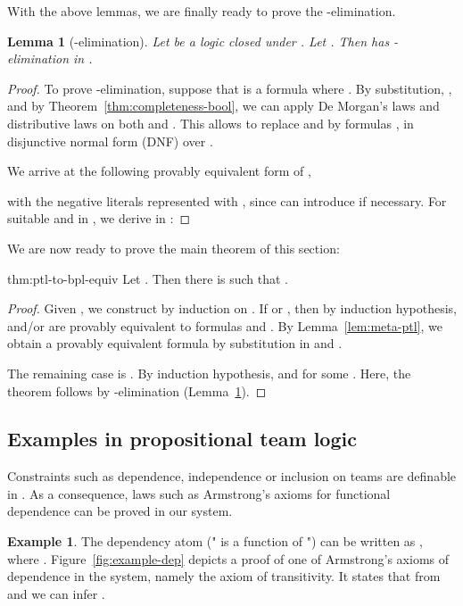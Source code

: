 \documentclass[a4paper,english,fleqn,11pt,final]{scrartcl}
\theoremstyle{plain}
\newtheorem{lemma}[theorem]{Lemma}
\theoremstyle{definition}
\newtheorem{example}[theorem]{Example}
\begin{document}
With the above lemmas, we are finally ready to prove the -elimination.

\begin{lemma}[-elimination]\label{lem:tensor-elim}
Let  be a logic closed under .
Let .
Then  has -elimination in .
\end{lemma}
\begin{proof}
To prove -elimination, suppose that  is a formula where .
By substitution, , and by Theorem~\ref{thm:completeness-bool}, we can apply De Morgan's laws and distributive laws on both  and .
This allows to replace  and  by formulas ,  in disjunctive normal form (DNF) over .

We arrive at the following provably equivalent form of ,

with the negative literals represented with , since  can introduce  if necessary.
For suitable  and  in , we derive in :
	
\end{proof}

We are now ready to prove the main theorem of this section:

\begin{reptheorem}{thm:ptl-to-bpl-equiv}
Let .
Then there is  such that .
\end{reptheorem}
\begin{proof}
Given , we construct  by induction on .
If  or , then by induction hypothesis,  and/or  are provably equivalent to  formulas  and .
By Lemma~\ref{lem:meta-ptl}, we obtain a provably equivalent formula  by substitution in  and .

The remaining case is .
By induction hypothesis,  and  for some .
Here, the theorem follows by -elimination (Lemma~\ref{lem:tensor-elim}).
\end{proof}



\subsection{Examples in propositional team logic}

Constraints such as dependence, independence or inclusion on teams are definable in .
As a consequence, laws such as Armstrong's axioms for functional dependence can be proved in our system.

\begin{example}
The dependency atom  (" is a function of ") can be written as , where .
Figure~\ref{fig:example-dep} depicts a proof of one of Armstrong's axioms of dependence \cite{armstrong} in the system, namely the axiom of transitivity.
It states that from  and  we can infer .
\end{example}
\end{document}
